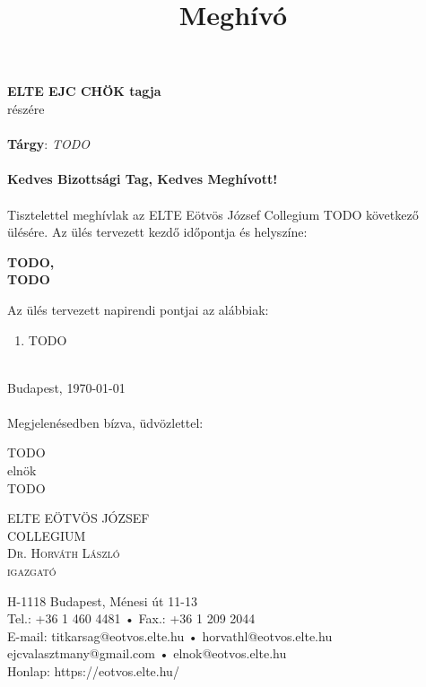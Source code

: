 \documentclass[12pt,a4paper]{article}
\title{Meghívó\vspace{-1.0cm}}
\date{}
\author{}
\makeatletter
\newcommand\Footer{

	{\footnotesize 
	\begin{minipage}[t]{0.4\textwidth}
		\begin{flushright}
		\textsc{
            {\color{darkblue} 
			ELTE EÖTVÖS JÓZSEF\\
			COLLEGIUM}\\
		    {\scriptsize 
		    Dr. Horváth László\\
			igazgató
            }
            }
		\end{flushright}
	\end{minipage}
	\hspace{1em}
	\begin{minipage}[t]{0.45\textwidth}
		\begin{flushleft}
			{\scriptsize H-1118 Budapest, Ménesi út 11-13\\
			Tel.: +36 1 460 4481 • Fax.: +36 1 209 2044\\
			E-mail:	titkarsag@eotvos.elte.hu • horvathl@eotvos.elte.hu\\
			ejcvalasztmany@gmail.com • elnok@eotvos.elte.hu\\
			Honlap: https://eotvos.elte.hu/ }
		\end{flushleft}
	\end{minipage}
	}
}
\newcommand{\signiture}[3]{
\begin{center}
	#1\\
	#2\\
	#3
\end{center}
}
\makeatother
\begin{document}
\vspace*{0.5cm}
\textbf{ELTE EJC CHÖK tagja}\\
részére\\
\\
\textbf{Tárgy}: \emph{TODO}\\ 
\\
\textbf{Kedves Bizottsági Tag, Kedves Meghívott!}\\
\\
Tisztelettel meghívlak az ELTE Eötvös József Collegium TODO következő
ülésére. Az ülés tervezett kezdő időpontja és helyszíne:

\begin{center}
\textbf{
TODO,\\
TODO
}
\end{center}

Az ülés tervezett napirendi pontjai az alábbiak:

\begin{enumerate}
    \item TODO
\end{enumerate}

\leavevmode\\
Budapest, \today \\
\\
Megjelenésedben bízva, üdvözlettel:
\vspace{5em}

\begin{flushright}
\begin{minipage}[t]{0.4\textwidth}
	\signiture{TODO}{elnök}{TODO}
\end{minipage}
\end{flushright}

\vfill

\begin{center}
	\Footer
\end{center}
\end{document}
